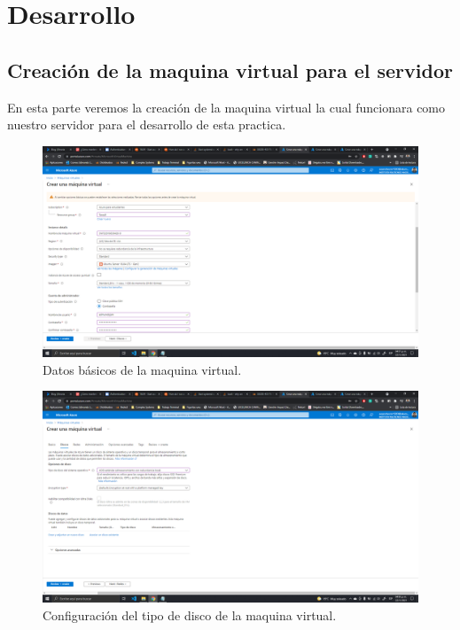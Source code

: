 \documentclass[11pt]{article}
\begin{document}
	\section{Desarrollo}
		\subsection{Creación de la maquina virtual para el servidor}
En esta parte veremos la creación de la maquina virtual la cual funcionara como nuestro servidor para el desarrollo de esta practica.
		\begin{figure}[H]
			\centering
			\includegraphics[scale=0.34]{resources/Infobasica0.png}
			\caption{Datos básicos de la maquina virtual.}\label{fig:picture}
		\end{figure}
		\begin{figure}[H]
			\centering
			\includegraphics[scale=0.34]{resources/disco0.png}
			\caption{Configuración del tipo de disco de la maquina virtual.}\label{fig:picture}
		\end{figure}
\end{document}
